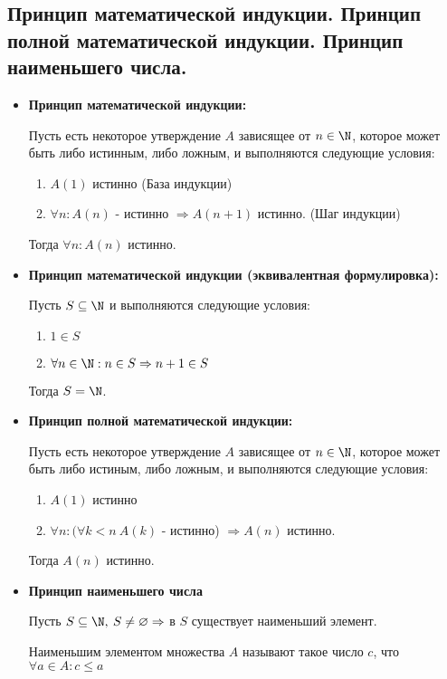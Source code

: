 \subsection{Принцип математической индукции. Принцип полной математической индукции. Принцип наименьшего числа.}{
	\begin{itemize}
		\item \textbf{Принцип математической индукции:}
		
		Пусть есть некоторое утверждение $A$ зависящее от $n \in \N$, которое может быть либо истинным, либо ложным, и выполняются следующие условия:
		\begin{enumerate}
			\item $A(1)$ истинно (База индукции)
			\item $\forall n : A(n)$ - истинно $\Rightarrow A(n + 1)$ истинно. (Шаг индукции)
		\end{enumerate}
		Тогда $\forall n : A(n)$ истинно.

		\item \textbf{Принцип математической индукции (эквивалентная формулировка):}

		Пусть $S \subseteq \N$ и выполняются следующие условия:
		\begin{enumerate}
			\item $1 \in S$
			\item $\forall n \in \N : n \in S \Rightarrow n + 1 \in S$
		\end{enumerate}
		Тогда $S = \N$.

		\item \textbf{Принцип полной математической индукции:}

		Пусть есть некоторое утверждение $A$ зависящее от $n \in \N$, которое может быть либо истиным, либо ложным, и выполняются следующие условия:
		\begin{enumerate}
			\item $A(1)$ истинно
			\item $\forall n : (\forall k < n \: A(k)$ - истинно) $\Rightarrow A(n)$ истинно.
		\end{enumerate}
		Тогда $A(n)$ истинно.

		\item \textbf{Принцип наименьшего числа}

		Пусть $S \subseteq \N, \: S \neq \varnothing \Rightarrow$ в $S$ существует наименьший элемент.

		Наименьшим элементом множества $A$ называют такое число $c$, что $\forall a \in A : c \leqslant a$

	\end{itemize}
}
